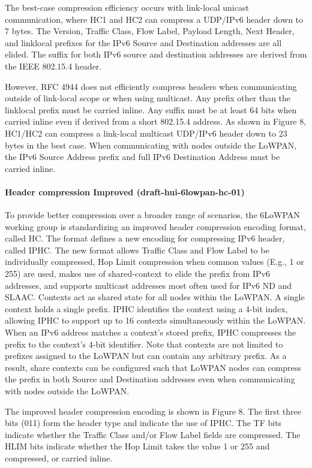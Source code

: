 The best-case compression efficiency occurs with link-local unicast communication,
	where HC1 and HC2 can compress a UDP/IPv6 header down to 7 bytes.
The Version,
	Traffic Class,
	Flow Label,
	Payload Length,
	Next Header,
	and linklocal prefixes for the IPv6 Source and Destination addresses are all elided.
The suffix for both IPv6 source and destination addresses are derived from the IEEE 802.15.4 header.

However,
	RFC 4944 does not efficiently compress headers when communicating outside of link-local scope or when using multicast.
Any prefix other than the linklocal prefix must be carried inline.
Any suffix must be at least 64 bits when carried inline even if derived from a short 802.15.4 address.
As shown in Figure 8,
	HC1/HC2 can compress a link-local multicast UDP/IPv6 header down to 23 bytes in the best case.
When communicating with nodes outside the LoWPAN,
	the IPv6 Source Address prefix and full IPv6 Destination Address must be carried inline.

\paragraph{Header compression Improved (draft-hui-6lowpan-hc-01)}

To provide better compression over a broader range of scenarios,
	the 6LoWPAN working group is standardizing an improved header compression encoding format,
	called HC.
The format defines a new encoding for compressing IPv6 header,
	called IPHC.
The new format allows Traffic Class and Flow Label to be individually compressed,
	Hop Limit compression when common values (E.g., 1 or 255) are used,
	makes use of shared-context to elide the prefix from IPv6 addresses,
	and supports multicast addresses most often used for IPv6 ND and SLAAC.
Contexts act as shared state for all nodes within the LoWPAN.
A single context holds a single prefix.
IPHC identifies the context using a 4-bit index,
	allowing IPHC to support up to 16 contexts simultaneously within the LoWPAN.
When an IPv6 address matches a context’s stored prefix,
	IPHC compresses the prefix to the context’s 4-bit identifier.
Note that contexts are not limited to prefixes assigned to the LoWPAN but can contain any arbitrary prefix.
As a result,
	share contexts can be configured such that LoWPAN nodes can compress the prefix in both Source and Destination addresses even when communicating with nodes outside the LoWPAN.

The improved header compression encoding is shown in Figure 8.
The first three bits (011) form the header type and indicate the use of IPHC.
The TF bits indicate whether the Traffic Class and/or Flow Label fields are compressed.
The HLIM bits indicate whether the Hop Limit takes the value 1 or 255 and compressed,
	or carried inline.

